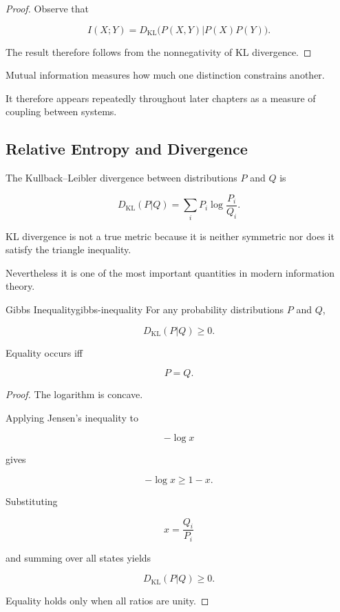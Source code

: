 \documentclass[12pt,twoside,openright]{book}
\begin{document}
\begin{proof}
Observe that

\[
I(X;Y)
=

D_{\mathrm{KL}}
\bigl(
P(X,Y)
|
P(X)P(Y)
\bigr).
\]

The result therefore follows from the
nonnegativity of KL divergence.
\end{proof}

Mutual information measures how much one distinction
constrains another.

It therefore appears repeatedly throughout later chapters
as a measure of coupling between systems.

\subsection{Relative Entropy and Divergence}

The Kullback--Leibler divergence between distributions
$P$ and $Q$ is

\[
D_{\mathrm{KL}}(P|Q)
=

\sum_i
P_i
\log
\frac{P_i}{Q_i}.
\]

KL divergence is not a true metric because it is neither
symmetric nor does it satisfy the triangle inequality.

Nevertheless it is one of the most important quantities
in modern information theory.

\begin{theorem}{Gibbs Inequality}{gibbs-inequality}
For any probability distributions
$P$ and $Q$,

\[
D_{\mathrm{KL}}(P|Q)\ge0.
\]

Equality occurs iff

\[
P=Q.
\]
\end{theorem}

\begin{proof}
The logarithm is concave.

Applying Jensen's inequality to

\[
-\log x
\]

gives

\[
-\log x
\ge
1-x.
\]

Substituting

\[
x
=

\frac{Q_i}{P_i}
\]

and summing over all states yields

\[
D_{\mathrm{KL}}(P|Q)
\ge0.
\]

Equality holds only when all ratios are unity.
\end{proof}
\end{document}
